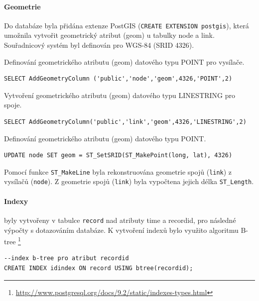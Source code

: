\documentclass[a4paper,12pt,oneside]{report}
\begin{document}
\paragraph*{Geometrie} Do databáze byla přidána extenze PostGIS (\texttt{CREATE EXTENSION postgis}), která umožnila vytvořit geometrický atribut (geom) u tabulky node a link. Souřadnicový systém byl definován pro WGS-84 (SRID 4326).

Definování geometrického atributu (geom) datového typu POINT pro vysílače. 

\begin{footnotesize}
\begin{lstlisting}[style=mybash]
SELECT AddGeometryColumn ('public','node','geom',4326,'POINT',2)
\end{lstlisting}
\end{footnotesize}

Vytvoření geometrického atributu (geom) datového typu LINESTRING pro spoje. 

\begin{footnotesize}
\begin{lstlisting}[style=mybash]
SELECT AddGeometryColumn('public','link','geom',4326,'LINESTRING',2)
\end{lstlisting}
\end{footnotesize}

Definování geometrického atributu (geom) datového typu POINT. 

\begin{footnotesize}
\begin{lstlisting}[style=mybash]
UPDATE node SET geom = ST_SetSRID(ST_MakePoint(long, lat), 4326)
\end{lstlisting}
\end{footnotesize}

Pomocí funkce \texttt{ST\_MakeLine} byla rekonstruována geometrie spojů (\texttt{link}) z vysílačů (\texttt{node}). Z geometrie spojů (\texttt{link}) byla vypočtena jejich délka \texttt{ST\_Length}.

\paragraph*{Indexy} byly vytvořeny v tabulce \texttt{record} nad atributy time a recordid, pro následné výpočty s dotazováním databáze. K vytvoření indexů bylo využito algoritmu B-tree \footnote{\url{http://www.postgresql.org/docs/9.2/static/indexes-types.html}}

\begin{footnotesize}
\begin{lstlisting}[style=mybash]
--index b-tree pro atribut recordid
CREATE INDEX idindex ON record USING btree(recordid);		
\end{lstlisting}
\end{footnotesize}
\end{document}
